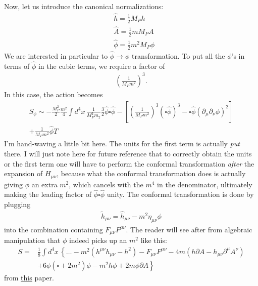 \documentclass{book}
\theoremstyle{definition}
\newcommand{\p}{\partial}
\newcommand{\nn}{\nonumber}
\newcommand{\f}[2]{\frac{#1}{#2}}
\newcommand{\lp}{\left(}
\newcommand{\rp}{\right)}
\newcommand{\lb}{\left[}
\newcommand{\rb}{\right]}
\newcommand{\lc}{\left\{}
\newcommand{\rc}{\right\}}
\begin{document}
\begin{framed}
	Now, let us introduce the canonical normalizations:
	\begin{align}
	&\hat{h} = \f{1}{2}M_P h\\
	&\hat{A} = \f{1}{2}mM_P A\\
	&\hat{\phi} = \f{1}{2}m^2 M_P \phi
	\end{align}
	We are interested in particular to $\hat\phi \to \phi$ transformation. To put all the $\phi$'s in terms of $\hat{\phi}$ in the cubic terms, we require a factor of
	\begin{align}
	\lp \f{1}{M_P m^2} \rp^3.
	\end{align}
	In this case, the action becomes
	\begin{align}
	S_\phi \sim -\f{M_P^2}{2}\f{m^2}{4}\int d^4x\, \f{1}{M_P^2 m_2}\f{3}{2}\hat\phi \square \hat\phi - \lb \lp \f{1}{M_P m^2} \rp^3(\square\hat\phi)^3 - \square \hat\phi (\p_\mu \p_\nu \phi)^2 \rb \nn\\+ \f{1}{M_Pm^2}\hat\phi T
	\end{align}
	I'm hand-waving a little bit here. The units for the first term is actually \textit{put} there. I will just note here for future reference that to correctly obtain the units or the first term one will have to perform the conformal transformation \textit{after} the expansion of $H_{\mu\nu}$, because what the conformal transformation does is actually giving $\phi$ an extra $m^2$, which cancels with the $m^4$ in the denominator, ultimately making the leading factor of $\hat\phi\square \hat\phi$ unity. The conformal transformation is done by plugging
	\begin{align}
	\tilde{h}_{\mu\nu} = \hat{h}_{\mu\nu} - m^2 \eta_{\mu\nu}\phi
	\end{align} 
	into the combination containing $F_{\mu\nu}F^{\mu\nu}$. The reader will see after from algebraic manipulation that $\phi$ indeed picks up an $m^2$ like this:
	\begin{align}
	S = &\f{1}{8}\int d^4x\, \lc \dots - m^2 \lp h^{\mu\nu}h_{\mu\nu} - h^2 \rp - F_{\mu\nu}F^{\mu\nu} - 4m\lp h\p A - h_{\mu\nu}\p^\mu A^\nu   \rp\right.\nn\\
	&\left.+ 6\phi (\square + 2m^2) \phi	 - m^2 h \phi + 2m\phi \p A	 \rc
	\end{align}
	from \href{https://arxiv.org/pdf/1304.7240.pdf}{\underline{this}} paper. \\
	

\end{framed}
\end{document}
